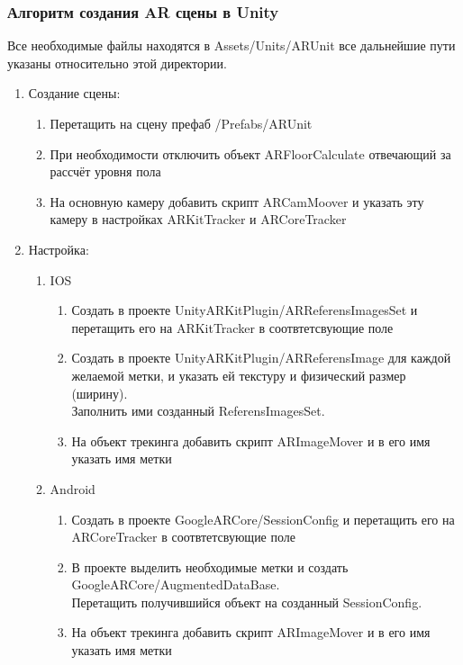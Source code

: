 \documentclass[a4paper, 11pt, titlepage]{article}
\begin{document}
      \subsubsection{Алгоритм создания AR сцены в Unity}
        Все необходимые файлы находятся в Assets/Units/ARUnit все дальнейшие пути указаны относительно этой директории.
        \begin{enumerate}
          \item Создание сцены:
            \begin{enumerate}
              \item Перетащить на сцену префаб /Prefabs/ARUnit
              \item При необходимости отключить объект ARFloorCalculate отвечающий за рассчёт уровня пола
              \item На основную камеру добавить скрипт ARCamMoover и указать эту камеру в настройках ARKitTracker и ARCoreTracker
            \end{enumerate}
            \item Настройка:
              \begin{enumerate}
                \item IOS
                \begin{enumerate}
                  \item Создать в проекте UnityARKitPlugin/ARReferensImagesSet и перетащить его на ARKitTracker в соотвтетсвующие поле
                  \item Создать в проекте UnityARKitPlugin/ARReferensImage для каждой желаемой метки, и указать ей текстуру и физический размер (ширину). \\
                    Заполнить ими созданный ReferensImagesSet.
                  \item На объект трекинга добавить скрипт ARImageMover и в его имя указать имя метки
                \end{enumerate}
                \item Android
                  \begin{enumerate}
                  \item Создать в проекте GoogleARCore/SessionConfig и перетащить его на ARCoreTracker в соотвтетсвующие поле
                  \item В проекте выделить необходимые метки и создать GoogleARCore/AugmentedDataBase. \\
                    Перетащить получившийся объект на созданный SessionConfig.
                  \item На объект трекинга добавить скрипт ARImageMover и в его имя указать имя метки

\end{enumerate}
\end{enumerate}
\end{enumerate}
\end{document}
